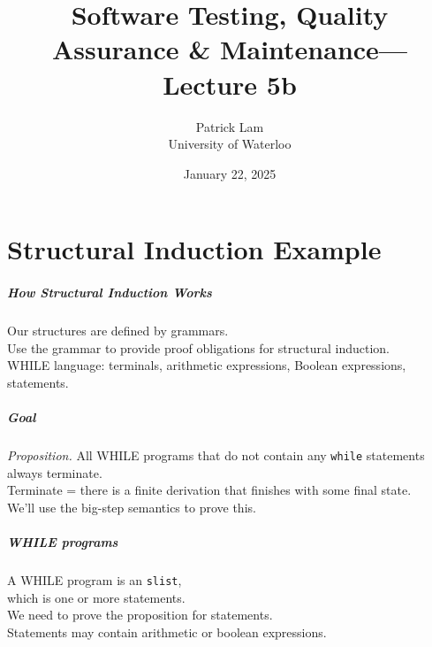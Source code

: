 \documentclass{beamer}
\title{Software Testing, Quality Assurance \& Maintenance---Lecture 5b}
\author{Patrick Lam\\University of Waterloo}
\date{January 22, 2025}
\newenvironment{changemargin}[1]{%
  \begin{list}{}{%
    \setlength{\topsep}{0pt}%
    \setlength{\leftmargin}{#1}%
    \setlength{\rightmargin}{1em}
    \setlength{\listparindent}{\parindent}%
    \setlength{\itemindent}{\parindent}%
    \setlength{\parsep}{\parskip}%
  }%
  \item[]}{\end{list}}
\begin{document}
\begin{frame}
  \titlepage
\end{frame}

\part{Structural Induction Example}
\begin{frame}
  \partpage
\end{frame}


\usebackgroundtemplate{}
\begin{frame}
  \frametitle{How Structural Induction Works}
  \Large
  \begin{changemargin}{2em}
    Our structures are defined by grammars.\\[1em]

    Use the grammar to provide proof obligations for structural induction.\\[1em]

    WHILE language: terminals, arithmetic expressions, Boolean expressions, statements.
  \end{changemargin}
\end{frame}

\begin{frame}
  \frametitle{Goal}
  \Large
  \begin{changemargin}{2em}

    \emph{Proposition.} All WHILE programs that do not contain any \texttt{while} statements always terminate.\\[1em]

    Terminate = there is a finite derivation that finishes with some final state.\\[1em]

    We'll use the big-step semantics to prove this.
  \end{changemargin}
\end{frame}

\begin{frame}
  \frametitle{WHILE programs}
  \Large
  \begin{changemargin}{2em}
    A WHILE program is an \texttt{slist}, \\
    which is one or more statements. \\[1em]

    We need to prove the proposition for statements.\\[1em]

    Statements may contain
    arithmetic or boolean expressions.
  \end{changemargin}
\end{frame}
\end{document}
